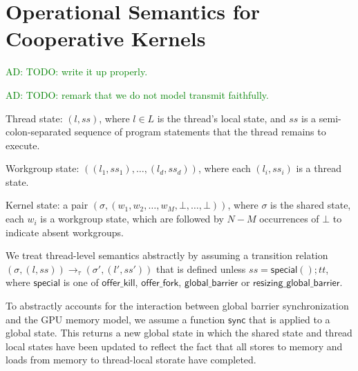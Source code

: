 \documentclass[numbers,nocopyrightspace,10pt]{sigplanconf}
\newcommand{\ADComment}[1]{\textcolor{green}{AD: #1}}
\newcommand{\offerfork}{\mathsf{offer\_fork}}
\newcommand{\offerkill}{\mathsf{offer\_kill}}
\newcommand{\globalbarrier}{\mathsf{global\_barrier}}
\newcommand{\resizingglobalbarrier}{\mathsf{resizing\_global\_barrier}}
\begin{document}
\clearpage




\appendix

\section{Operational Semantics for Cooperative Kernels}\label{appendix:semantics}

\ADComment{TODO: write it up properly.}

\ADComment{TODO: remark that we do not model transmit faithfully.}

Thread state: $(l, \mathit{ss})$, where $l \in L$ is the thread's
local state, and $\mathit{ss}$ is a semi-colon-separated sequence of
program statements that the thread remains to execute.

Workgroup state: $((l_1, \mathit{ss}_1), \dots, (l_d,
\mathit{ss}_d))$, where each $(l_i, \mathit{ss}_i)$ is a thread state.

Kernel state: a pair $(\sigma, (w_1, w_2, \dots, w_M, \bot, \dots, \bot))$, where $\sigma$ is the shared state,
each $w_i$ is a workgroup state, which are
followed by $N-M$ occurrences of $\bot$ to indicate absent workgroups.

We treat thread-level semantics abstractly by assuming a transition
relation $(\sigma, (l, \mathit{ss})) \rightarrow_{\tau} (\sigma', (l',
\mathit{ss}'))$ that is defined unless $\mathit{ss} =
\mathsf{special}(); \mathit{tt}$, where $\mathsf{special}$ is one of
$\offerkill$, $\offerfork$, $\globalbarrier$ or
$\resizingglobalbarrier$.

To abstractly accounts for the interaction between global barrier
synchronization and the GPU memory model, we assume a function
$\mathsf{sync}$ that is applied to a global state.  This returns a new
global state in which the shared state and thread local states have
been updated to reflect the fact that all stores to memory and loads
from memory to thread-local storate have completed.
\end{document}
